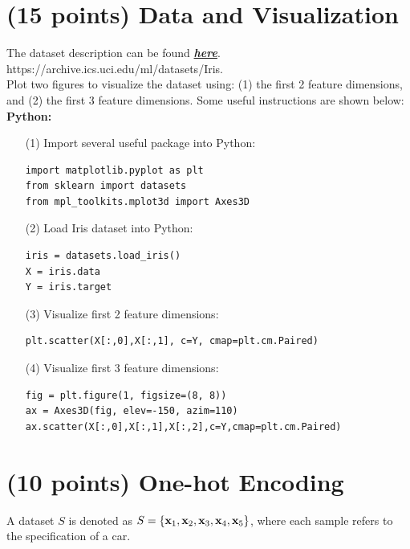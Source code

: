 \documentclass[12pt]{article}%
\begin{document}
\section{(15 points) Data and Visualization}
The dataset description can be found \href{https://archive.ics.uci.edu/ml/datasets/Iris}{\textbf{\emph{here}}}.\\
https://archive.ics.uci.edu/ml/datasets/Iris.\\
Plot two figures to visualize the dataset using: (1) the first 2 feature dimensions, and (2) the first 3 feature dimensions. Some useful instructions are shown below: \\
\textbf{Python:}
\begin{enumerate}
\item[{(1)}] Import several useful package into Python:
\begin{verbatim}
import matplotlib.pyplot as plt
from sklearn import datasets
from mpl_toolkits.mplot3d import Axes3D
\end{verbatim}
\item[{(2)}] Load Iris dataset into Python:
\begin{verbatim}
iris = datasets.load_iris()
X = iris.data
Y = iris.target
\end{verbatim}
\item[{(3)}] Visualize first 2 feature dimensions:
\begin{verbatim}
plt.scatter(X[:,0],X[:,1], c=Y, cmap=plt.cm.Paired)
\end{verbatim}
\item[{(4)}] Visualize first 3 feature dimensions:
\begin{verbatim}
fig = plt.figure(1, figsize=(8, 8))
ax = Axes3D(fig, elev=-150, azim=110)
ax.scatter(X[:,0],X[:,1],X[:,2],c=Y,cmap=plt.cm.Paired)
\end{verbatim}
\end{enumerate}
\vspace{30mm}

\section{(10 points) One-hot Encoding}
A dataset $S$ is denoted as $S=\{{\bf x}_1,{\bf x}_2,{\bf x}_3,{\bf x}_4,{\bf x}_5 \}$, where each sample refers to the specification of a car.
\end{document}
